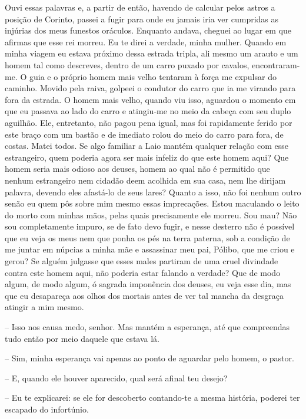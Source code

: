 Ouvi essas palavras e, a partir de então, havendo de calcular pelos
astros a posição de Corinto, passei a fugir para onde eu jamais iria ver
cumpridas as injúrias dos meus funestos oráculos. Enquanto andava,
cheguei ao lugar em que afirmas que esse rei  morreu. Eu te direi a
verdade, minha mulher. Quando em minha viagem eu estava próximo dessa
estrada tripla, ali mesmo um arauto e um homem tal como descreves,
dentro de um carro puxado por cavalos, encontraram-me. O guia e o
próprio homem mais velho tentaram à força me expulsar do caminho. Movido
pela raiva, golpeei o condutor do carro que ia me virando para fora da
estrada. O homem mais velho, quando viu isso, aguardou o momento em que
eu passava ao lado do carro e atingiu-me no meio  da cabeça com seu
duplo aguilhão. Ele, entretanto, não pagou pena igual, mas foi
rapidamente ferido por este braço com um bastão e de imediato rolou do
meio do carro para fora, de costas. Matei todos. Se algo familiar a Laio
mantém qualquer relação com esse estrangeiro, quem poderia agora ser
mais infeliz do que este homem aqui? Que homem seria mais odioso aos
deuses, homem ao qual não é permitido que nenhum estrangeiro nem cidadão
deem acolhida em sua casa, nem lhe dirijam palavra, devendo eles
afastá-lo de seus lares? Quanto a isso, não foi nenhum outro senão eu
quem pôs  sobre mim mesmo essas imprecações. Estou maculando o
leito do morto com minhas mãos, pelas quais precisamente ele morreu. Sou
mau? Não sou completamente impuro, se de fato devo fugir, e nesse
desterro não é possível que eu veja os meus nem que ponha os pés na
terra paterna, sob a condição de me juntar em núpcias a minha mãe e
assassinar meu pai, Pólibo, que me criou e gerou? Se alguém julgasse que
esses males partiram de uma cruel divindade contra este homem aqui, não
poderia estar falando a  verdade? Que de modo algum, de modo algum,
ó sagrada imponência dos deuses, eu veja esse dia, mas que eu desapareça
aos olhos dos mortais antes de ver tal mancha da desgraça atingir a mim
mesmo.

 --   Isso nos causa medo, senhor. Mas mantém a esperança, até que compreendas
tudo então por meio daquele que estava lá.

 --   Sim, minha esperança vai apenas ao ponto de aguardar pelo homem, o
pastor.

 --   E, quando ele houver aparecido, qual será afinal teu desejo?

 --    Eu te explicarei: se ele for descoberto contando-te a mesma
história, poderei ter escapado do infortúnio.

